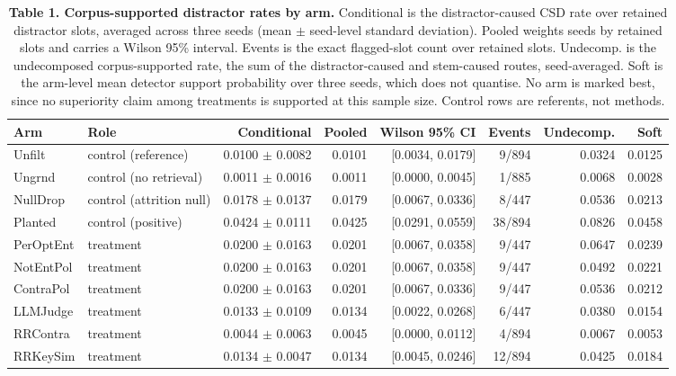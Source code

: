 \documentclass[11pt]{article}
\begin{document}
\begin{table}[t]
\centering
\small
\begin{tabular}{llrrrrrr}
\toprule
\textbf{Arm} & \textbf{Role} & \textbf{Conditional} & \textbf{Pooled} & \textbf{Wilson 95\% CI} & \textbf{Events} & \textbf{Undecomp.} & \textbf{Soft} \\
\midrule
Unfilt & control (reference) & 0.0100 $\pm$ 0.0082 & 0.0101 & [0.0034, 0.0179] & 9/894 & 0.0324 & 0.0125 \\
Ungrnd & control (no retrieval) & 0.0011 $\pm$ 0.0016 & 0.0011 & [0.0000, 0.0045] & 1/885 & 0.0068 & 0.0028 \\
NullDrop & control (attrition null) & 0.0178 $\pm$ 0.0137 & 0.0179 & [0.0067, 0.0336] & 8/447 & 0.0536 & 0.0213 \\
Planted & control (positive) & 0.0424 $\pm$ 0.0111 & 0.0425 & [0.0291, 0.0559] & 38/894 & 0.0826 & 0.0458 \\
PerOptEnt & treatment & 0.0200 $\pm$ 0.0163 & 0.0201 & [0.0067, 0.0358] & 9/447 & 0.0647 & 0.0239 \\
NotEntPol & treatment & 0.0200 $\pm$ 0.0163 & 0.0201 & [0.0067, 0.0358] & 9/447 & 0.0492 & 0.0221 \\
ContraPol & treatment & 0.0200 $\pm$ 0.0163 & 0.0201 & [0.0067, 0.0336] & 9/447 & 0.0536 & 0.0212 \\
LLMJudge & treatment & 0.0133 $\pm$ 0.0109 & 0.0134 & [0.0022, 0.0268] & 6/447 & 0.0380 & 0.0154 \\
RRContra & treatment & 0.0044 $\pm$ 0.0063 & 0.0045 & [0.0000, 0.0112] & 4/894 & 0.0067 & 0.0053 \\
RRKeySim & treatment & 0.0134 $\pm$ 0.0047 & 0.0134 & [0.0045, 0.0246] & 12/894 & 0.0425 & 0.0184 \\
\bottomrule
\end{tabular}
\caption{\textbf{Table 1. Corpus-supported distractor rates by arm.} Conditional is the distractor-caused CSD rate over retained distractor slots, averaged across three seeds (mean $\pm$ seed-level standard deviation). Pooled weights seeds by retained slots and carries a Wilson 95\% interval. Events is the exact flagged-slot count over retained slots. Undecomp. is the undecomposed corpus-supported rate, the sum of the distractor-caused and stem-caused routes, seed-averaged. Soft is the arm-level mean detector support probability over three seeds, which does not quantise. No arm is marked best, since no superiority claim among treatments is supported at this sample size. Control rows are referents, not methods.}
\label{tab:1}
\end{table}
\end{document}
